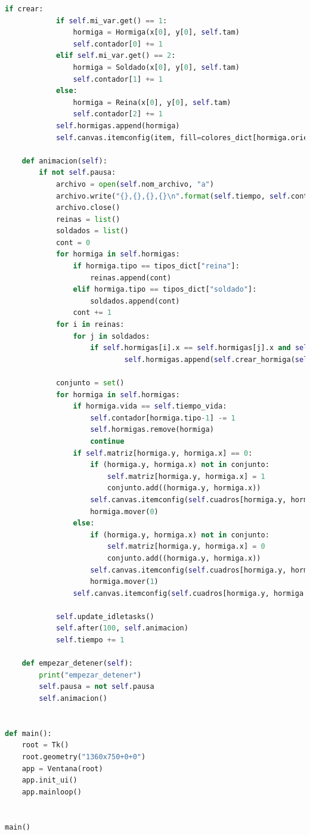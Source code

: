 \begin{lstlisting}[language=Python]
        if crear:
            if self.mi_var.get() == 1:
                hormiga = Hormiga(x[0], y[0], self.tam)
                self.contador[0] += 1
            elif self.mi_var.get() == 2:
                hormiga = Soldado(x[0], y[0], self.tam)
                self.contador[1] += 1
            else:
                hormiga = Reina(x[0], y[0], self.tam)
                self.contador[2] += 1
            self.hormigas.append(hormiga)
            self.canvas.itemconfig(item, fill=colores_dict[hormiga.orientacion])

    def animacion(self):
        if not self.pausa:
            archivo = open(self.nom_archivo, "a")
            archivo.write("{},{},{},{}\n".format(self.tiempo, self.contador[0], self.contador[1], self.contador[2]))
            archivo.close()
            reinas = list()
            soldados = list()
            cont = 0
            for hormiga in self.hormigas:
                if hormiga.tipo == tipos_dict["reina"]:
                    reinas.append(cont)
                elif hormiga.tipo == tipos_dict["soldado"]:
                    soldados.append(cont)
                cont += 1
            for i in reinas:
                for j in soldados:
                    if self.hormigas[i].x == self.hormigas[j].x and self.hormigas[i].y == self.hormigas[j].y:
                            self.hormigas.append(self.crear_hormiga(self.hormigas[i].x, self.hormigas[i].y))

            conjunto = set()
            for hormiga in self.hormigas:
                if hormiga.vida == self.tiempo_vida:
                    self.contador[hormiga.tipo-1] -= 1
                    self.hormigas.remove(hormiga)
                    continue
                if self.matriz[hormiga.y, hormiga.x] == 0:
                    if (hormiga.y, hormiga.x) not in conjunto:
                        self.matriz[hormiga.y, hormiga.x] = 1
                        conjunto.add((hormiga.y, hormiga.x))
                    self.canvas.itemconfig(self.cuadros[hormiga.y, hormiga.x], fill=hormiga.color)
                    hormiga.mover(0)
                else:
                    if (hormiga.y, hormiga.x) not in conjunto:
                        self.matriz[hormiga.y, hormiga.x] = 0
                        conjunto.add((hormiga.y, hormiga.x))
                    self.canvas.itemconfig(self.cuadros[hormiga.y, hormiga.x], fill="black")
                    hormiga.mover(1)
                self.canvas.itemconfig(self.cuadros[hormiga.y, hormiga.x], fill=colores_dict[hormiga.orientacion])

            self.update_idletasks()
            self.after(100, self.animacion)
            self.tiempo += 1

    def empezar_detener(self):
        print("empezar_detener")
        self.pausa = not self.pausa
        self.animacion()


def main():
    root = Tk()
    root.geometry("1360x750+0+0")
    app = Ventana(root)
    app.init_ui()
    app.mainloop()


main()
\end{lstlisting}

